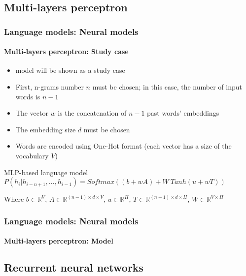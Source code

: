 \documentclass[xcolor=table]{beamer}
\begin{document}
\subsection{Multi-layers perceptron}

\begin{frame}
\frametitle{Language models: Neural models}
\framesubtitle{Multi-layers perceptron: Study case}

\begin{itemize}
	\item \cite{2003-bengio-al} model will be shown as a study case
	\item First, n-grams number $n$ must be chosen; in this case, the number of input words is $n-1$
	\item The vector $w$ is the concatenation of $n-1$ past words' embeddings
	\item The embedding size $d$ must be chosen  
	\item Words are encoded using One-Hot format (each vector has a size of the vocabulary $V$)
\end{itemize}

\begin{block}{MLP-based language model}
	$
	P(h_i|h_{i-n+1},\ldots, h_{i-1}) = 
	Softmax \left(
	(b + w A) 
	+ 
	W\ Tanh(u + w T)
	\right)
	$
	
	Where $b \in \mathbb{R}^{V},\, A \in \mathbb{R}^{(n-1) \times d \times V},\, u \in \mathbb{R}^{H},\, T \in \mathbb{R}^{(n-1) \times d \times H},\, W \in \mathbb{R}^{V \times H}$
\end{block}

\end{frame}

\begin{frame}
\frametitle{Language models: Neural models}
\framesubtitle{Multi-layers perceptron: Model}

\begin{center}
\end{center}

\end{frame}

\subsection{Recurrent neural networks}
\end{document}
